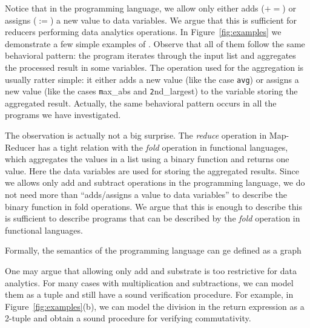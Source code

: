 \documentclass[runningheads,a4paper]{llncs}
\newcommand\addeq{+\!\!=}
\begin{document}
Notice that in the programming language, we allow only either adds ($\addeq$) or assigns ($:=$) a new value to data variables. 
We argue that this is sufficient for reducers performing data analytics operations.
In Figure~\ref{fig:examples} we demonstrate a few simple examples of . Observe that all of them follow the same behavioral pattern: the program iterates through the input list and aggregates the processed result in some variables. The operation used for the aggregation is usually ratter simple: it either adds a new value (like the case \texttt{avg}) or assigns a new value (like the cases {\texttt max\_abs} and {\texttt 2nd\_largest}) to the variable storing the aggregated result. Actually, the same behavioral pattern occurs in all the programs we have investigated.

The observation is actually not a big surprise. The \emph{reduce} operation in Map-Reducer has a tight relation with the \emph{fold} operation in functional languages, which aggregates the values in a list using a binary function and returns one value. Here the data variables are used for storing the aggregated results. Since we allows only add and subtract operations in the programming language, we do not need more than ``adds/assigns a value to data variables'' to describe the binary function in fold operations. We argue that this is enough to describe this is sufficient to describe programs that can be described by the \emph{fold} operation in functional languages.

Formally, the semantics of the programming language can ge defined as a graph


One may argue that allowing only add and substrate is too restrictive for data analytics. For many cases with multiplication and subtractions, we can model them as a tuple and still have a sound verification procedure. For example, in Figure~\ref{fig:examples}(b), we can model the division in the return expression as a 2-tuple and obtain a sound procedure for verifying commutativity. 
\end{document}
